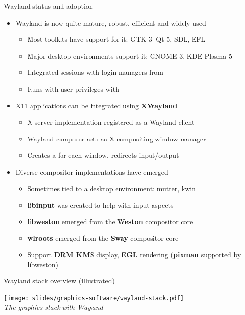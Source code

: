 \begin{frame}{Wayland status and adoption}
  \begin{itemize}
  \item Wayland is now quite mature, robust, efficient and widely used
    \begin{itemize}
    \item Most toolkits have support for it: GTK 3, Qt 5, SDL, EFL
    \item Major desktop environments support it: GNOME 3, KDE Plasma 5
    \item Integrated sessions with login managers from 
    \item Runs with user privileges with 
    \end{itemize}
  \item X11 applications can be integrated using \textbf{XWayland}
    \begin{itemize}
    \item X server implementation registered as a Wayland client
    \item Wayland composer acts as X compositing window manager
    \item Creates a  for each window, redirects input/output
    \end{itemize}
  \item Diverse compositor implementations have emerged
    \begin{itemize}
    \item Sometimes tied to a desktop environment: mutter, kwin
    \item \textbf{libinput} was created to help with input aspects
    \item \textbf{libweston} emerged from the \textbf{Weston} compositor core
    \item \textbf{wlroots} emerged from the \textbf{Sway} compositor core
    \item Support \textbf{DRM KMS} display, \textbf{EGL} rendering (\textbf{pixman} supported by libweston)
    \end{itemize}
  \end{itemize}
\end{frame}

\begin{frame}{Wayland stack overview (illustrated)}
  \begin{center}
  \texttt{[image: slides/graphics-software/wayland-stack.pdf]}\\
  \textit{\small The graphics stack with Wayland}\\
  \end{center}
\end{frame}

